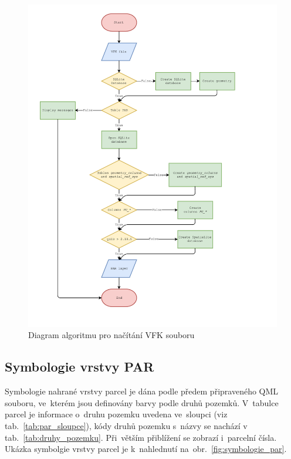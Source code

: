 	\begin{figure}[H]
		\centering
		\includegraphics[width=1.2\textwidth]{./pictures/nacitani_vfk_souboru.pdf}
		\caption[Diagram algoritmu pro načítání VFK souboru]{Diagram algoritmu pro načítání VFK souboru}
		\label{fig:diagram_nacitani_vfk}
 	\end{figure}

\subsection{Symbologie vrstvy PAR}
\label{symbologie_par}

Symbologie nahrané vrstvy parcel je dána podle předem připraveného QML souboru, ve~kterém jsou definovány barvy podle druhů pozemků. V~tabulce parcel je informace o~druhu pozemku uvedena ve~sloupci  (viz tab.~\ref{tab:par_sloupce}), kódy druhů pozemku s~názvy se nachází v tab.~\ref{tab:druhy_pozemku}. Při~větším přiblížení se zobrazí i~parcelní čísla. Ukázka symbolgie vrstvy parcel je k~nahlednutí na~obr.~\ref{fig:symbologie_par}.

